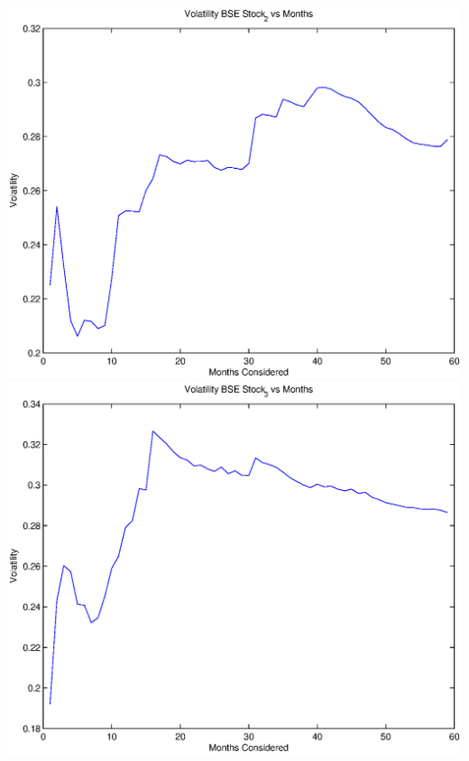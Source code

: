 \documentclass{article}
\begin{document}
\includegraphics[width=\textwidth]{Volatility_BSE_Stock_2_vs_Months} \\

\includegraphics[width=\textwidth]{Volatility_BSE_Stock_3_vs_Months} \\
\end{document}

